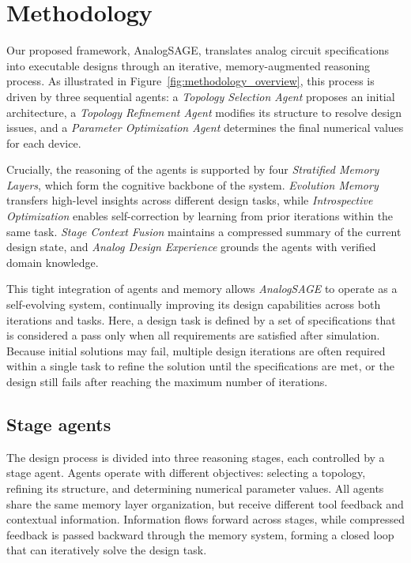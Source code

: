 \section{Methodology}


Our proposed framework, AnalogSAGE, translates analog circuit specifications into executable designs through an iterative, memory-augmented reasoning process. As illustrated in Figure~\ref{fig:methodology_overview}, this process is driven by three sequential agents: a \emph{Topology Selection Agent} proposes an initial architecture, a \emph{Topology Refinement Agent} modifies its structure to resolve design issues, and a \emph{Parameter Optimization Agent} determines the final numerical values for each device.


Crucially, the reasoning of the agents is supported by four \textit{Stratified Memory Layers}, which form the cognitive backbone of the system. \textit{Evolution Memory} transfers high-level insights across different design tasks, while \textit{Introspective Optimization} enables self-correction by learning from prior iterations within the same task. \textit{Stage Context Fusion} maintains a compressed summary of the current design state, and \textit{Analog Design Experience} grounds the agents with verified domain knowledge.

This tight integration of agents and memory allows \textit{AnalogSAGE} to operate as a self-evolving system, continually improving its design capabilities across both iterations and tasks. Here, a design task is defined by a set of specifications that is considered a pass only when all requirements are satisfied after simulation. Because initial solutions may fail, multiple design iterations are often required within a single task to refine the solution until the specifications are met, or the design still fails after reaching the maximum number of iterations.



\subsection{Stage agents}




The design process is divided into three reasoning stages, each controlled by a stage agent. Agents operate with different objectives: selecting a topology, refining its structure, and determining numerical parameter values. All agents share the same memory layer organization, but receive different tool feedback and contextual information. Information flows forward across stages, while compressed feedback is passed backward through the memory system, forming a closed loop that can iteratively solve the design task.


